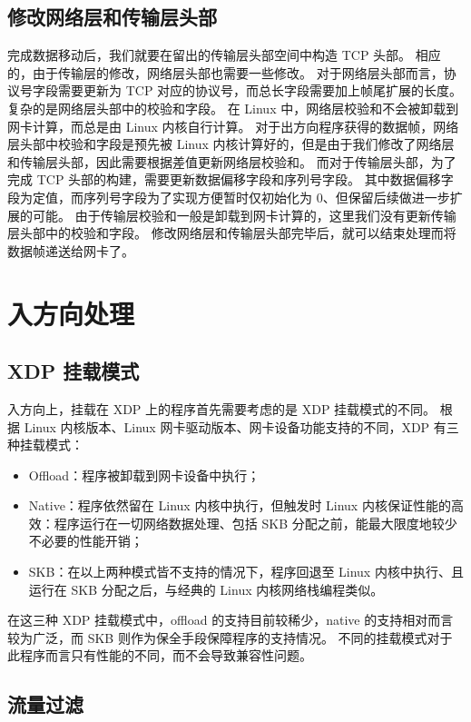 \subsection{修改网络层和传输层头部}

完成数据移动后，我们就要在留出的传输层头部空间中构造 TCP 头部。
相应的，由于传输层的修改，网络层头部也需要一些修改。
对于网络层头部而言，协议号字段需要更新为 TCP 对应的协议号，而总长字段需要加上帧尾扩展的长度。
复杂的是网络层头部中的校验和字段。
在 Linux 中，网络层校验和不会被卸载到网卡计算，而总是由 Linux 内核自行计算。
对于出方向程序获得的数据帧，网络层头部中校验和字段是预先被 Linux 内核计算好的，但是由于我们修改了网络层和传输层头部，因此需要根据差值更新网络层校验和。
而对于传输层头部，为了完成 TCP 头部的构建，需要更新数据偏移字段和序列号字段。
其中数据偏移字段为定值，而序列号字段为了实现方便暂时仅初始化为 0、但保留后续做进一步扩展的可能。
由于传输层校验和一般是卸载到网卡计算的，这里我们没有更新传输层头部中的校验和字段。
修改网络层和传输层头部完毕后，就可以结束处理而将数据帧递送给网卡了。

\section{入方向处理}

\subsection{XDP 挂载模式}

入方向上，挂载在 XDP 上的程序首先需要考虑的是 XDP 挂载模式的不同。
根据 Linux 内核版本、Linux 网卡驱动版本、网卡设备功能支持的不同，XDP 有三种挂载模式：

\begin{itemize}
  \item Offload：程序被卸载到网卡设备中执行；
  \item Native：程序依然留在 Linux 内核中执行，但触发时 Linux 内核保证性能的高效：程序运行在一切网络数据处理、包括 SKB 分配之前，能最大限度地较少不必要的性能开销；
  \item SKB：在以上两种模式皆不支持的情况下，程序回退至 Linux 内核中执行、且运行在 SKB 分配之后，与经典的 Linux 内核网络栈编程类似。
\end{itemize}

在这三种 XDP 挂载模式中，offload 的支持目前较稀少，native 的支持相对而言较为广泛，而 SKB 则作为保全手段保障程序的支持情况。
不同的挂载模式对于此程序而言只有性能的不同，而不会导致兼容性问题。

\subsection{流量过滤}

